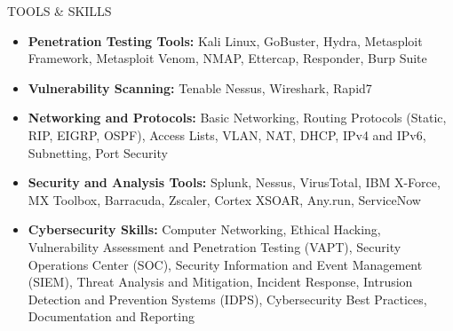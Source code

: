 \documentclass{resume} %
\begin{document}
\begin{rSection}{TOOLS \& SKILLS}
\begin{itemize}
    \item \textbf{Penetration Testing Tools:} Kali Linux, GoBuster, Hydra, Metasploit Framework, Metasploit Venom, NMAP, Ettercap, Responder, Burp Suite
    \item \textbf{Vulnerability Scanning:} Tenable Nessus, Wireshark, Rapid7
    \item \textbf{Networking and Protocols:} Basic Networking, Routing Protocols (Static, RIP, EIGRP, OSPF), Access Lists, VLAN, NAT, DHCP, IPv4 and IPv6, Subnetting, Port Security
    \item \textbf{Security and Analysis Tools:} Splunk, Nessus, VirusTotal, IBM X-Force, MX Toolbox, Barracuda, Zscaler, Cortex XSOAR, Any.run, ServiceNow
    \item \textbf{Cybersecurity Skills:} Computer Networking, Ethical Hacking, Vulnerability Assessment and Penetration Testing (VAPT), Security Operations Center (SOC), Security Information and Event Management (SIEM), Threat Analysis and Mitigation, Incident Response, Intrusion Detection and Prevention Systems (IDPS), Cybersecurity Best Practices, Documentation and Reporting
\end{itemize}
\end{rSection}
\end{document}
